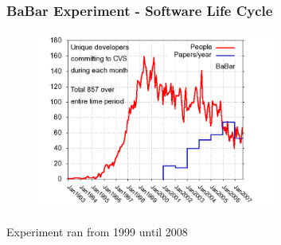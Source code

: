 \begin{frame}
\frametitle{BaBar Experiment - Software Life Cycle}

\begin{figure}[htbp]
\begin{center}
\includegraphics[width=0.7\textwidth]{images/babar-developers-per-month.png}
\end{center}
\end{figure}

\begin{center}
\small{Experiment ran from 1999 until 2008}
\end{center}

\end{frame}



